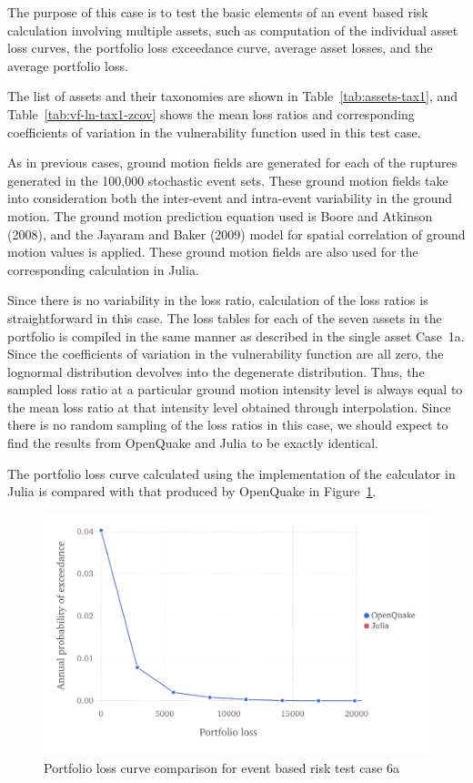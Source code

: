 The purpose of this case is to test the basic elements of an event based risk calculation involving multiple assets, such as computation of the individual asset loss curves, the portfolio loss exceedance curve, average asset losses, and the average portfolio loss.

The list of assets and their taxonomies are shown in Table~\ref{tab:assets-tax1}, and Table~\ref{tab:vf-ln-tax1-zcov} shows the mean loss ratios and corresponding coefficients of variation in the vulnerability function used in this test case.

As in previous cases, ground motion fields are generated for each of the ruptures generated in the 100,000 stochastic event sets. These ground motion fields take into consideration both the inter-event and intra-event variability in the ground motion. The ground motion prediction equation used is Boore and Atkinson (2008), and the Jayaram and Baker (2009) model for spatial correlation of ground motion values is applied. These ground motion fields are also used for the corresponding calculation in Julia.

Since there is no variability in the loss ratio, calculation of the loss ratios is straightforward in this case. The loss tables for each of the seven assets in the portfolio is compiled in the same manner as described in the single asset Case~1a. Since the coefficients of variation in the vulnerability function are all zero, the lognormal distribution devolves into the degenerate distribution. Thus, the sampled loss ratio at a particular ground motion intensity level is always equal to the mean loss ratio at that intensity level obtained through interpolation. Since there is no random sampling of the loss ratios in this case, we should expect to find the results from OpenQuake and Julia to be exactly identical.

The portfolio loss curve calculated using the implementation of the calculator in Julia is compared with that produced by OpenQuake in Figure~\ref{fig:lc-ebr-6a}.

\begin{figure}[htbp]
\centering
\includegraphics[width=12cm]{qareport/figures/fig-lc-ebr-6a}
\caption{Portfolio loss curve comparison for event based risk test case 6a}
\label{fig:lc-ebr-6a}
\end{figure}